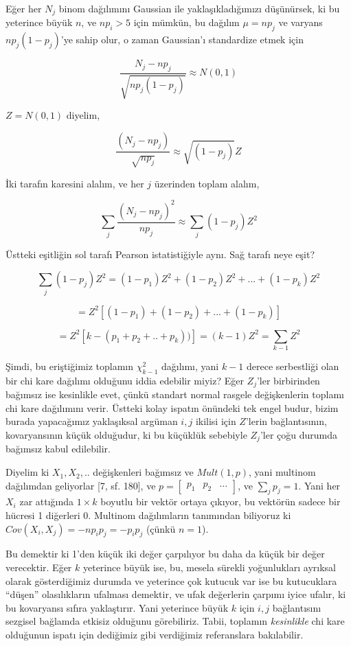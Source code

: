 \documentclass[12pt,fleqn]{article}\usepackage{../../common}
\begin{document}
Eğer her $N_j$ binom dağılımını Gaussian ile yaklaşıkladığımızı düşünürsek,
ki bu yeterince büyük $n$, ve $np_i>5$ için mümkün, bu dağılım $\mu=np_j$
ve varyans $np_j(1-p_j)$'ye sahip olur, o zaman Gaussian'ı standardize
etmek için

$$ \frac{N_j-np_j}{\sqrt{np_j(1-p_j)}} \approx N(0,1) $$

$Z=N(0,1)$ diyelim,

$$
\frac{(N_j - np_j)}{\sqrt{np_j} } \approx  \sqrt{(1-p_j)}Z
$$

İki tarafın karesini alalım, ve her $j$ üzerinden toplam alalım,

$$
\sum_j \frac{(N_j - np_j)^2}{np_j} \approx \sum_j (1-p_j)Z^2
$$

Üstteki eşitliğin sol tarafı Pearson istatistiğiyle aynı. Sağ tarafı neye
eşit? 

$$
\sum_j (1-p_j)Z^2 =  (1-p_1)Z^2 + (1-p_2)Z^2 + ... + (1-p_k)Z^2 
$$

$$
 =  Z^2 [(1-p_1) + (1-p_2) + ... + (1-p_k)]
$$

$$
 =  Z^2 [k - (p_1+p_2+..+p_k))] = (k-1)Z^2 = \sum_{k-1} Z^2 
$$

Şimdi, bu eriştiğimiz toplamın $\chi^2_{k-1}$ dağılımı, yani $k-1$ derece
serbestliği olan bir chi kare dağılımı olduğunu iddia edebilir miyiz? Eğer
$Z_j$'ler birbirinden bağımsız ise kesinlikle evet, çünkü standart normal
rasgele değişkenlerin toplamı chi kare dağılımını verir. Üstteki kolay
ispatın önündeki tek engel budur, bizim burada yapacağımız yaklaşıksal
argüman $i,j$ ikilisi için $Z$'lerin bağlantısının, kovaryansının küçük
olduğudur, ki bu küçüklük sebebiyle $Z_j$'ler çoğu durumda bağımsız kabul
edilebilir.

Diyelim ki $X_1,X_2,..$ değişkenleri bağımsız ve $Mult(1,p)$, yani multinom 
dağılımdan geliyorlar [7, sf. 180], ve $p = \left[\begin{array}{ccc} p_1 & p_2 &
 \dots \end{array}\right]$, ve $\sum_j p_j = 1$. 
Yani her $X_i$ zar attığında $1 \times k$ boyutlu bir vektör ortaya çıkıyor, bu vektörün
sadece bir hücresi 1 diğerleri 0. Multinom dağılımların
tanımından biliyoruz ki $Cov(X_i,X_j) = -n p_ip_j = -p_ip_j$ (çünkü $n=1$). 

Bu demektir ki 1'den küçük iki değer çarpılıyor bu daha da küçük bir değer
verecektir. Eğer $k$ yeterince büyük ise, bu, mesela sürekli yoğunlukları
ayrıksal olarak gösterdiğimiz durumda ve yeterince çok kutucuk var ise bu
kutucuklara ``düşen'' olasılıkların ufalması demektir, ve ufak değerlerin
çarpımı iyice ufalır, ki bu kovaryansı sıfıra yaklaştırır. Yani yeterince
büyük $k$ için $i,j$ bağlantısını sezgisel bağlamda etkisiz olduğunu
görebiliriz. Tabii, toplamın {\em kesinlikle} chi kare olduğunun ispatı
için dediğimiz gibi verdiğimiz referanslara bakılabilir. 
\end{document}
